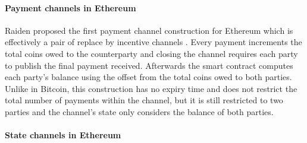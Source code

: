 \documentclass{llncs}
\begin{document}
\paragraph{Payment channels in Ethereum}
Raiden proposed the first payment channel construction for Ethereum which is effectively a pair of replace by incentive channels \cite{raidenCode}. 
Every payment increments the total coins owed to the counterparty and closing the channel requires each party to publish the final payment received. 
Afterwards the smart contract computes each party's balance using the offset from the total coins owed to both parties. 
Unlike in Bitcoin, this construction has no expiry time and does not restrict the total number of payments within the channel, but it is still restricted to two parties and the channel's state only considers the balance of both parties. 

\paragraph{State channels in Ethereum} 
\end{document}
